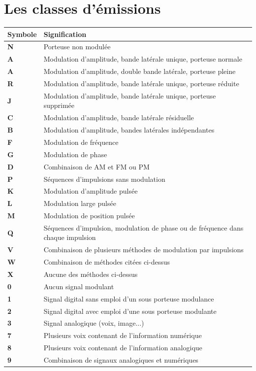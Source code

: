 \documentclass[a4paper,12pt,oneside]{report} %
\begin{document}
		\section{Les classes d'émissions} \label{emittingClassesFull}
		\begin{center}
	  	\begin{longtable}{|L{1.5cm}|L{13cm}|}
	      \hline
	      Symbole & Signification \tabularnewline
	    	\hline
			\hline
			\textbf{N} & Porteuse non modulée  \tabularnewline
	      \hline
	      \textbf{A} & Modulation d'amplitude, bande latérale unique, porteuse normale  \tabularnewline
	      \hline
			\textbf{A} & Modulation d'amplitude, double bande latérale, porteuse pleine  \tabularnewline
	      \hline
			\textbf{R} & Modulation d'amplitude, bande latérale unique, porteuse réduite  \tabularnewline
	      \hline
	\textbf{J} & Modulation d'amplitude,  bande latérale unique, porteuse supprimée \tabularnewline
	      \hline
		\textbf{C} & Modulation d'amplitude, bande latérale résiduelle   \tabularnewline
		\hline
		\textbf{B} & Modulation d'amplitude, bandes latérales indépendantes  \tabularnewline
		\hline
		\textbf{F} & Modulation de fréquence  \tabularnewline
		\hline
		\textbf{G} & Modulation de phase  \tabularnewline
		\hline
		\textbf{D} &	Combinaison de AM et FM ou PM\tabularnewline
		\hline
		\textbf{P} &	Séquences d'impulsions sans modulation\tabularnewline
		\hline
		\textbf{K} &	Modulation d'amplitude pulsée\tabularnewline
		\hline
		\textbf{L} &	Modulation large pulsée\tabularnewline
		\hline
		\textbf{M} &	Modulation de position pulsée\tabularnewline
		\hline
		\textbf{Q} &	Séquences d'impulsion, modulation de phase ou de fréquence dans chaque impulsion\tabularnewline
		\hline
		\textbf{V} &	Combinaison de plusieurs méthodes de modulation par impulsions\tabularnewline
		\hline
		\textbf{W} &	Combinaison de méthodes citées ci-dessus\tabularnewline
		\hline
		\textbf{X} &	Aucune des méthodes ci-dessus\tabularnewline
	     	\hline
			\hline
			\hline
			\hline
		\textbf{0} & Aucun signal modulant   \tabularnewline
	      \hline
		\textbf{1} & Signal digital sans emploi d'un sous porteuse modulance   \tabularnewline
	      \hline
		\textbf{2} & Signal digital avec  emploi d'une sous porteuse modulante   \tabularnewline
		\hline
		\textbf{3} & Signal analogique (voix, image...)   \tabularnewline
		\hline
		\textbf{7} & Plusieurs voix contenant de l'information numérique   \tabularnewline
		\hline
		\textbf{8} & Plusieurs voix contenant de l'information analogique   \tabularnewline
		\hline
		\textbf{9} & Combinaison de signaux analogiques et numériques   \tabularnewline

\end{longtable}
\end{center}
\end{document}
